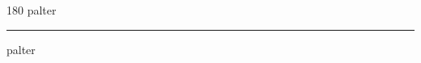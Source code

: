
\begin{frame}
\begin{center}
\begin{turn}{180}
{\fontsize{2.5cm}{1em}\selectfont palter}
\end{turn}
\vspace{1em}\par  
\hrule
\vspace{1em}\par  
{\fontsize{2.5cm}{1em}\selectfont palter}
\end{center}
\end{frame}
